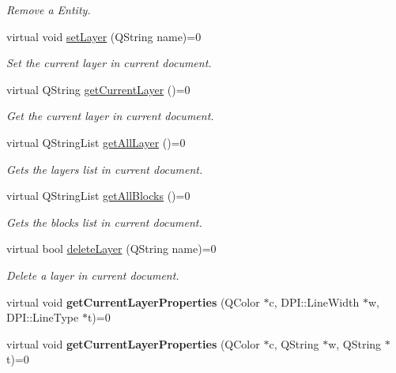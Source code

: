\begin{DoxyCompactItemize}
\begin{DoxyCompactList}\small\item\em Remove a Entity. \end{DoxyCompactList}\item 
virtual void \hyperlink{classDocument__Interface_a32cb7bf0798d060e3ed06dcfe470303c}{set\-Layer} (Q\-String name)=0
\begin{DoxyCompactList}\small\item\em Set the current layer in current document. \end{DoxyCompactList}\item 
virtual Q\-String \hyperlink{classDocument__Interface_a74ec266e1a3b9c354e0812d34d62ac99}{get\-Current\-Layer} ()=0
\begin{DoxyCompactList}\small\item\em Get the current layer in current document. \end{DoxyCompactList}\item 
virtual Q\-String\-List \hyperlink{classDocument__Interface_af9c58f0a2b9fa6b751e74ebfdfbaea14}{get\-All\-Layer} ()=0
\begin{DoxyCompactList}\small\item\em Gets the layers list in current document. \end{DoxyCompactList}\item 
virtual Q\-String\-List \hyperlink{classDocument__Interface_a691612623f64ea900426c974ac3f53d2}{get\-All\-Blocks} ()=0
\begin{DoxyCompactList}\small\item\em Gets the blocks list in current document. \end{DoxyCompactList}\item 
virtual bool \hyperlink{classDocument__Interface_a0de3466ffbba2c504452ae242ba246b9}{delete\-Layer} (Q\-String name)=0
\begin{DoxyCompactList}\small\item\em Delete a layer in current document. \end{DoxyCompactList}\item 
\hypertarget{classDocument__Interface_a03335bd33778de74209ab7d61df72313}{virtual void {\bfseries get\-Current\-Layer\-Properties} (Q\-Color $\ast$c, D\-P\-I\-::\-Line\-Width $\ast$w, D\-P\-I\-::\-Line\-Type $\ast$t)=0}\label{classDocument__Interface_a03335bd33778de74209ab7d61df72313}

\item 
\hypertarget{classDocument__Interface_a8513ff8042d2f4c4e95c777d021c6fe2}{virtual void {\bfseries get\-Current\-Layer\-Properties} (Q\-Color $\ast$c, Q\-String $\ast$w, Q\-String $\ast$t)=0}\label{classDocument__Interface_a8513ff8042d2f4c4e95c777d021c6fe2}


\end{DoxyCompactItemize}
